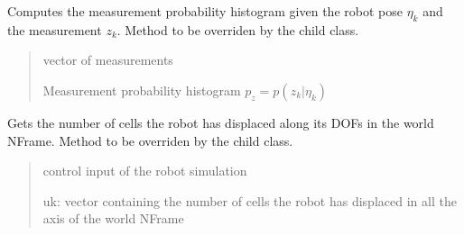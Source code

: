 \documentclass[letterpaper,10pt,english]{sphinxmanual}
\begin{document}
\begin{fulllineitems}
\begin{fulllineitems}
\begin{quote}
\begin{description}
\end{description}\end{quote}

\end{fulllineitems}


\begin{fulllineitems}
\label{\detokenize{GridLocalization:GL.GL.MeasurementProbability}}
\pysigstartsignatures
{}
\pysigstopsignatures
\sphinxAtStartPar
Computes the measurement probability histogram given the robot pose \(\eta_k\) and the measurement \(z_k\).
Method to be overriden by the child class.
\begin{quote}\begin{description}
\sphinxAtStartPar
{} \textendash{} vector of measurements

\sphinxAtStartPar
Measurement probability histogram \(p_z=p(z_k | \eta_k)\)

\end{description}\end{quote}

\end{fulllineitems}


\begin{fulllineitems}
\label{\detokenize{GridLocalization:GL.GL.GetInput}}
\pysigstartsignatures
{}
\pysigstopsignatures
\sphinxAtStartPar
Gets the number of cells the robot has displaced along its DOFs in the world N\sphinxhyphen{}Frame.
Method to be overriden by the child class.
\begin{quote}\begin{description}
\sphinxAtStartPar
{} \textendash{} control input of the robot simulation

\sphinxAtStartPar
uk: vector containing the number of cells the robot has displaced in all the axis of the world N\sphinxhyphen{}Frame

\end{description}\end{quote}


\end{fulllineitems}
\end{fulllineitems}
\end{document}
